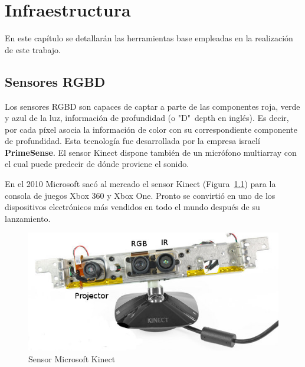 
\chapter{Infraestructura} %

\label{Chapter3} %

En este capítulo se detallarán las herramientas base empleadas en la realización de este trabajo.


\section{Sensores RGBD}

Los sensores RGBD son capaces de captar a parte de las componentes roja, verde y azul de la luz, información de profundidad (o "D"\ depth en inglés). Es decir, por cada píxel asocia la información de color con su correspondiente componente de profundidad. Esta tecnología fue desarrollada por la empresa israelí \textbf{PrimeSense}. El sensor Kinect dispone también de un micrófono multiarray con el cual puede predecir de dónde proviene el sonido.

En el 2010 Microsoft sacó al mercado el sensor Kinect (Figura~\ref{fig:Kinect}) para la consola de juegos Xbox 360 y Xbox One. Pronto se convirtió en uno de los dispositivos electrónicos más vendidos en todo el mundo después de su lanzamiento.

\begin{figure}[th]
\centering
\includegraphics[scale=0.85]{Figures/ros_kinect.jpg}
\decoRule
\caption[Sensor Kinect]{Sensor Microsoft Kinect}
\label{fig:Kinect}
\end{figure}

